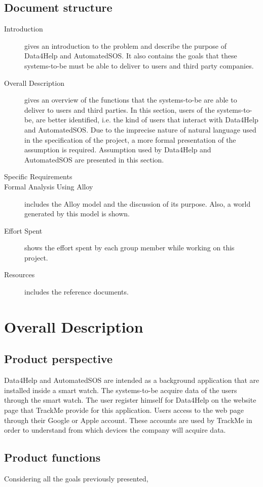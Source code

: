 \documentclass{article}
\begin{document}
\subsection{Document structure}
\begin{description}
	\item [Introduction] gives an introduction to the problem and describe the purpose of Data4Help and AutomatedSOS. It also contains the goals that these systems-to-be must be able to deliver to users and third party companies.
	\item [Overall Description] gives an overview of the functions that the systems-to-be are able to deliver to users and third parties. In this section, users of the systems-to-be, are better identified, i.e. the kind of users that interact with Data4Help and AutomatedSOS. Due to the imprecise nature of natural language used in the specification of the project, a more formal presentation of the assumption is required. Assumption used by Data4Help and AutomatedSOS are presented in this section. 
	\item [Specific Requirements]
	\item [Formal Analysis Using Alloy] includes the Alloy model and the discussion of its purpose. Also, a world generated by this model is shown.
	\item [Effort Spent] shows the effort spent by each group member while working on this project.
	\item [Resources] includes the reference documents. 
\end{description}
\section{Overall Description}
\subsection{Product perspective}
Data4Help and AutomatedSOS are intended as a background application that are installed inside a smart watch. The systems-to-be acquire data of the users through the smart watch. The user register himself for Data4Help on the website page that TrackMe provide for this application. Users access to the web page through their Google or Apple account. These accounts are used by TrackMe in order to understand from which devices the company will acquire data.  
\subsection{Product functions}
Considering all the goals previously presented, 
\end{document}
